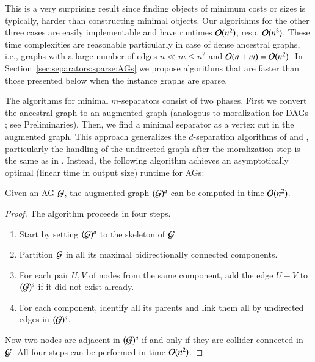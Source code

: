  This is a very surprising result since finding objects of minimum costs or sizes is typically, harder than constructing minimal objects. Our algorithms for the other three cases are easily implementable and have runtimes ${\cal O}(n^2)$, resp. ${\cal O}(n^3)$. These time complexities are reasonable particularly in case of dense ancestral graphs, i.e., graphs with a large number of edges $n \ll m \le n^2$ and $ {\cal O}(n+m) = {\cal O}(n^2) $. In Section~\ref{sec:separators:sparse:AGs} we propose algorithms that are faster than those presented below when the instance graphs are sparse.

The algorithms for minimal $m$-separators consist of two phases. First we convert the ancestral graph to an augmented graph (analogous to moralization for DAGs \cite{Spirtes2000}; see Preliminaries). Then, we find a minimal separator as a vertex cut in the augmented graph. This approach generalizes the $d$-separation algorithms of \cite{TianPP1998} and \cite{TextorLiskiewicz2011}, particularly the handling of the undirected graph after the moralization step is the same as in \cite{TianPP1998}.  Instead, the following algorithm achieves an asymptotically optimal (linear time in output size) runtime for AGs:

\begin{lemma}
Given an AG ${\cal G}$, the augmented graph $({\cal G})^a$ can be computed in
time ${\cal O}(n^2)$. 
\end{lemma}
\begin{proof}
The algorithm proceeds in four steps.
\begin{enumerate}
\item  Start by setting $({\cal G})^a$ to the skeleton of ${\cal G}$. 
\item  Partition ${\cal G}$ in all its maximal bidirectionally connected components. 
\item  For each pair $U,V$ of nodes from 
the same component, add the edge $U-V$ to $({\cal G})^a$ if it did not exist already.
\item  For each component, identify all its parents %
%
and link them all by undirected edges
in $({\cal G})^a$. 
\end{enumerate}
Now two nodes are adjacent in $({\cal G})^a$ if and only if they are 
collider connected in ${\cal G}$. All four steps can be performed in time ${\cal O}(n^2)$.
\end{proof}
%
%
%
%
%
%
%
%
%


